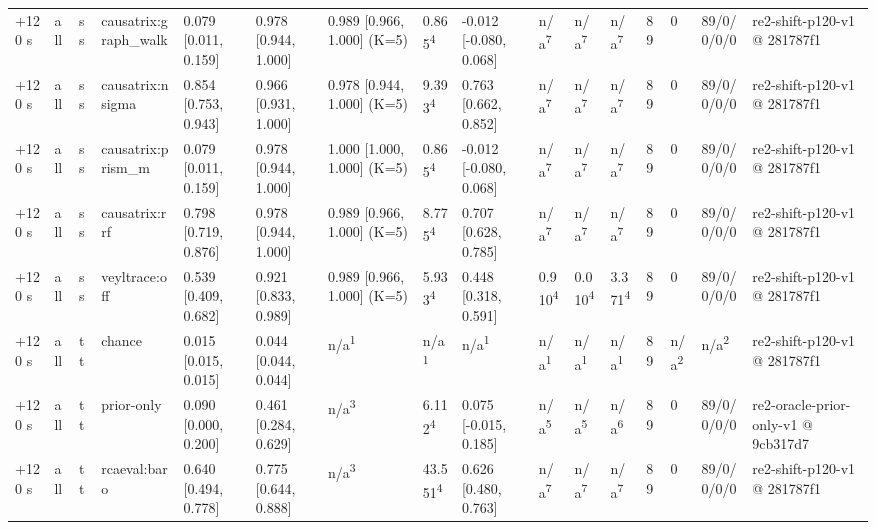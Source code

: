 \begin{table}[t]
\begin{tabular}{llllllllllllllll}
+120 s & all & ss & causatrix:graph\_walk & 0.079 [0.011, 0.159] & 0.978 [0.944, 1.000] & 0.989 [0.966, 1.000] (K=5) & 0.865\textsuperscript{4} & -0.012 [-0.080, 0.068] & n/a\textsuperscript{7} & n/a\textsuperscript{7} & n/a\textsuperscript{7} & 89 & 0 & 89/0/0/0/0 & re2-shift-p120-v1 @ 281787f1 \\
+120 s & all & ss & causatrix:nsigma & 0.854 [0.753, 0.943] & 0.966 [0.931, 1.000] & 0.978 [0.944, 1.000] (K=5) & 9.393\textsuperscript{4} & 0.763 [0.662, 0.852] & n/a\textsuperscript{7} & n/a\textsuperscript{7} & n/a\textsuperscript{7} & 89 & 0 & 89/0/0/0/0 & re2-shift-p120-v1 @ 281787f1 \\
+120 s & all & ss & causatrix:prism\_m & 0.079 [0.011, 0.159] & 0.978 [0.944, 1.000] & 1.000 [1.000, 1.000] (K=5) & 0.865\textsuperscript{4} & -0.012 [-0.080, 0.068] & n/a\textsuperscript{7} & n/a\textsuperscript{7} & n/a\textsuperscript{7} & 89 & 0 & 89/0/0/0/0 & re2-shift-p120-v1 @ 281787f1 \\
+120 s & all & ss & causatrix:rrf & 0.798 [0.719, 0.876] & 0.978 [0.944, 1.000] & 0.989 [0.966, 1.000] (K=5) & 8.775\textsuperscript{4} & 0.707 [0.628, 0.785] & n/a\textsuperscript{7} & n/a\textsuperscript{7} & n/a\textsuperscript{7} & 89 & 0 & 89/0/0/0/0 & re2-shift-p120-v1 @ 281787f1 \\
+120 s & all & ss & veyltrace:off & 0.539 [0.409, 0.682] & 0.921 [0.833, 0.989] & 0.989 [0.966, 1.000] (K=5) & 5.933\textsuperscript{4} & 0.448 [0.318, 0.591] & 0.910\textsuperscript{4} & 0.010\textsuperscript{4} & 3.371\textsuperscript{4} & 89 & 0 & 89/0/0/0/0 & re2-shift-p120-v1 @ 281787f1 \\
+120 s & all & tt & chance & 0.015 [0.015, 0.015] & 0.044 [0.044, 0.044] & n/a\textsuperscript{1} & n/a\textsuperscript{1} & n/a\textsuperscript{1} & n/a\textsuperscript{1} & n/a\textsuperscript{1} & n/a\textsuperscript{1} & 89 & n/a\textsuperscript{2} & n/a\textsuperscript{2} & re2-shift-p120-v1 @ 281787f1 \\
+120 s & all & tt & prior-only & 0.090 [0.000, 0.200] & 0.461 [0.284, 0.629] & n/a\textsuperscript{3} & 6.112\textsuperscript{4} & 0.075 [-0.015, 0.185] & n/a\textsuperscript{5} & n/a\textsuperscript{5} & n/a\textsuperscript{6} & 89 & 0 & 89/0/0/0/0 & re2-oracle-prior-only-v1 @ 9cb317d7 \\
+120 s & all & tt & rcaeval:baro & 0.640 [0.494, 0.778] & 0.775 [0.644, 0.888] & n/a\textsuperscript{3} & 43.551\textsuperscript{4} & 0.626 [0.480, 0.763] & n/a\textsuperscript{7} & n/a\textsuperscript{7} & n/a\textsuperscript{7} & 89 & 0 & 89/0/0/0/0 & re2-shift-p120-v1 @ 281787f1 \\

\end{tabular}
\end{table}
